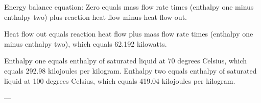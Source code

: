 Energy balance equation:  
Zero equals mass flow rate times (enthalpy one minus enthalpy two) plus reaction heat flow minus heat flow out.  

Heat flow out equals reaction heat flow plus mass flow rate times (enthalpy one minus enthalpy two), which equals 62.192 kilowatts.  

Enthalpy one equals enthalpy of saturated liquid at 70 degrees Celsius, which equals 292.98 kilojoules per kilogram.  
Enthalpy two equals enthalpy of saturated liquid at 100 degrees Celsius, which equals 419.04 kilojoules per kilogram.  

---